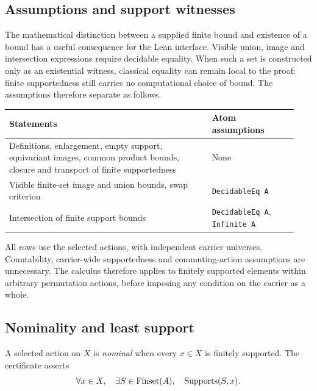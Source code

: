 \subsection{Assumptions and support witnesses}
\label{sec:support-assumptions}

The mathematical distinction between a supplied finite bound and existence
of a bound has a useful consequence for the Lean interface. Visible union,
image and intersection expressions require decidable equality. When such
a set is constructed only as an existential witness, classical equality
can remain local to the proof: finite supportedness still carries no
computational choice of bound. The assumptions therefore separate as follows.

\begin{center}
\small
\begin{tabular}{@{}>{\raggedright\arraybackslash}p{0.66\linewidth}
  >{\raggedright\arraybackslash}p{0.28\linewidth}@{}}
\hline
Statements & Atom assumptions \\
\hline
Definitions, enlargement, empty support, equivariant images,
common product bounds, closure and transport of finite supportedness & None \\
Visible finite-set image and union bounds, swap criterion &
  \texttt{DecidableEq A} \\
Intersection of finite support bounds &
  \texttt{DecidableEq A}, \texttt{Infinite A} \\
\hline
\end{tabular}
\end{center}

All rows use the selected actions, with independent carrier universes.
Countability, carrier-wide supportedness and commuting-action assumptions
are unnecessary. The calculus therefore applies to finitely supported
elements within arbitrary permutation actions, before imposing any
condition on the carrier as a whole.

\subsection{Nominality and least support}
\label{sec:least-support}

\begin{definition}
A selected action on $X$ is \emph{nominal} when every $x\in X$ is finitely
supported. The certificate asserts
\[
  \forall x\in X,\quad
  \exists S\in\operatorname{Finset}(A),\quad\operatorname{Supports}(S,x).
\]
\end{definition}

